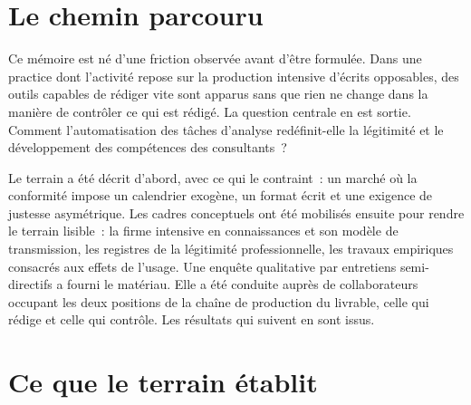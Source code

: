 
\section{Le chemin parcouru}

Ce mémoire est né d'une friction observée avant d'être formulée. Dans une practice
dont l'activité repose sur la production intensive d'écrits opposables, des outils capables
de rédiger vite sont apparus sans que rien ne change dans la manière de contrôler ce qui est
rédigé. La question centrale en est sortie. Comment l'automatisation des tâches d'analyse
redéfinit-elle la légitimité et le développement des compétences des consultants~?

Le terrain a été
décrit d'abord, avec ce qui le contraint~: un marché où la conformité impose un calendrier
exogène, un format écrit et une exigence de justesse asymétrique. Les cadres conceptuels ont
été mobilisés ensuite pour rendre le terrain lisible~: la firme
intensive en connaissances et son modèle de transmission, les registres de la légitimité
professionnelle, les travaux empiriques consacrés aux effets de l'usage. Une enquête
qualitative par entretiens semi-directifs a fourni le matériau. Elle a été conduite auprès de
collaborateurs occupant les deux positions de la chaîne de production du livrable, celle qui
rédige et celle qui contrôle. Les résultats qui suivent en sont issus.

\section{Ce que le terrain établit}

